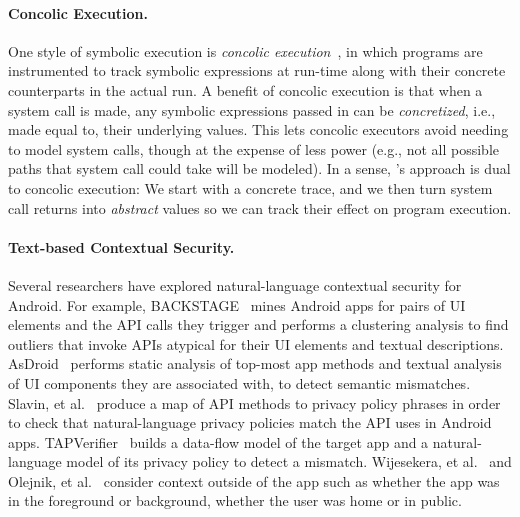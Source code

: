 
\paragraph*{Concolic Execution.}

One style of symbolic execution is \emph{concolic
  execution}~\cite{Godefroid:2005:DDA:1065010.1065036,
  Sen:2005:CCU:1081706.1081750, Cadar:2006:EXE}, in which programs are
instrumented to track symbolic expressions at run-time along with
their concrete counterparts in the actual run.  A benefit of concolic
execution is that when a system call is made, any symbolic expressions
passed in can be \emph{concretized}, i.e., made equal to, their
underlying values. This lets concolic executors avoid needing to model
system calls, though at the expense of less power (e.g., not all
possible paths that system call could take will be modeled).  In a
sense, \hogarth{}'s approach is dual to concolic execution: We start
with a concrete trace, and we then turn system call returns into
\emph{abstract} values so we can track their effect on program
execution.



\paragraph*{Text-based Contextual Security.}

Several researchers have explored natural-language contextual security for Android.
%
For example, BACKSTAGE~\cite{avdiienkodetecting} mines Android apps for
pairs of UI elements and the API calls they trigger and performs a
clustering analysis to find outliers that invoke APIs atypical for their
UI elements and textual descriptions.
%
AsDroid~\cite{Huang2014} performs static analysis of top-most app methods
and textual analysis of UI components they are associated with, to detect
semantic mismatches.
%
Slavin, et al.~\cite{slavin2016toward} produce a map of API methods to
privacy policy phrases in order to check that natural-language privacy
policies match the API uses in Android apps.
%
TAPVerifier~\cite{yu2016revisiting} builds a data-flow model of the target app
and a natural-language model of its privacy policy to detect a mismatch.
%
Wijesekera, et al.~\cite{WijesekeraBTREW17} and Olejnik, et al.~\cite{olejnik2017}
consider context outside of the app such as whether the app was in the foreground
or background, whether the user was home or in public.


